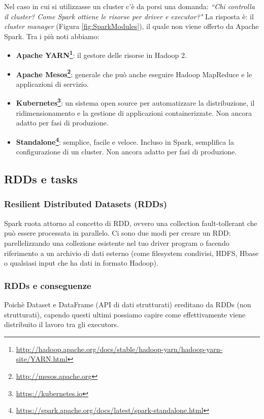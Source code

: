 \documentclass[12pt,italian]{article}
\begin{document}
\par Nel caso in cui si utilizzasse un cluster c'è da porsi una domanda: \textit{``Chi controlla il cluster? Come Spark ottiene le risorse per driver e executor?"}
\newline La risposta è: il \textit{cluster manager} (Figura \ref{fig:SparkModules}), il quale non viene offerto da Apache Spark. Tra i più noti abbiamo:
\begin{itemize}
	\item\textbf{Apache YARN\footnote{\url{http://hadoop.apache.org/docs/stable/hadoop-yarn/hadoop-yarn-site/YARN.html}}}: il gestore delle risorse in Hadoop 2.
	\item\textbf{Apache Mesos\footnote{\url{http://mesos.apache.org}}}: generale che può anche eseguire Hadoop MapReduce e le applicazioni di servizio.
	\item\textbf{Kubernetes\footnote{\url{https://kubernetes.io}}}: un sistema open source per automatizzare la distribuzione, il ridimensionamento e la gestione di applicazioni containerizzate. Non ancora adatto per fasi di produzione.
	\item\textbf{Standalone\footnote{\url{https://spark.apache.org/docs/latest/spark-standalone.html}}}: semplice, facile e veloce. Incluso in Spark, semplifica la configurazione di un cluster. Non ancora adatto per fasi di produzione. 
\end{itemize}

\subsection{RDDs  e tasks}
\subsubsection{Resilient Distributed Datasets (RDDs)}\label{sec:RDD}
Spark ruota attorno al concetto di RDD, ovvero una collection fault-tollerant che può essere processata in parallelo. Ci sono due modi per creare un RDD: parellelizzando una collezione esistente nel tuo driver program o facendo riferimento a un archivio di dati esterno (come filesystem condivisi, HDFS, Hbase o qualsiasi input che ha dati in formato Hadoop).

\subsubsection{RDDs e conseguenze}
Poichè Dataset e DataFrame (API di dati strutturati) ereditano da RDDs (non strutturati), capendo questi ultimi possiamo capire come effettivamente viene distribuito il lavoro tra gli executors.
\end{document}
